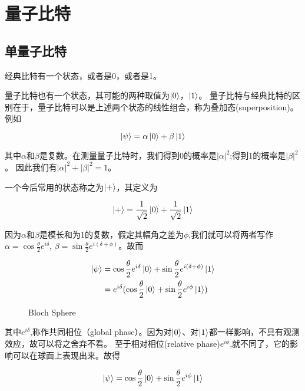 \section{量子比特}

\subsection{单量子比特}

经典比特有一个状态，或者是0，或者是1。

量子比特也有一个状态，其可能的两种取值为$\ket{0}$，$\ket{1}$。
量子比特与经典比特的区别在于，量子比特可以是上述两个状态的线性组合，称为叠加态(superposition)。例如

\begin{equation}
\ket{\psi} = \alpha\ket{0} + \beta\ket{1}
\end{equation}

其中$\alpha$和$\beta$是复数。在测量量子比特时，我们得到0的概率是$|\alpha|^2$;得到1的概率是$|\beta|^2$。
因此我们有$|\alpha|^2 + |\beta|^2 = 1$。

一个今后常用的状态称之为$\ket{+}$，其定义为

\begin{equation}
\ket{+} = \frac{1}{\sqrt{2}}\ket{0} + \frac{1}{\sqrt{2}}\ket{1}
\end{equation}

因为$\alpha$和$\beta$是模长和为1的复数，假定其幅角之差为$\phi$,我们就可以将两者写作
$\alpha = \cos\frac{\theta}{2}e^{i\delta}$, $\beta = \sin\frac{\theta}{2}e^{i(\delta + \phi)}$。故而

\begin{equation}
\begin{aligned}
\ket{\psi} &= \cos\frac{\theta}{2}e^{i\delta}\ket{0} + \sin\frac{\theta}{2}e^{i(\delta + \phi)}\ket{1} \\
&= e^{i\delta}(\cos\frac{\theta}{2}\ket{0} + \sin\frac{\theta}{2}e^{i\phi}\ket{1})
\end{aligned}
\end{equation}

\begin{figure}
  \centering
  
  \caption{Bloch Sphere}
\end{figure}

其中$e^{i\delta}$,称作共同相位（global phase）。因为对$\ket{0}$、对$\ket{1}$都一样影响，不具有观测效应，故可以将之舍弃不看。
至于相对相位(relative phase)$e^{i\phi}$,就不同了，它的影响可以在球面上表现出来。故得

\begin{equation}
\ket{\psi} = \cos\frac{\theta}{2}\ket{0} + \sin\frac{\theta}{2}e^{i\phi}\ket{1}
\end{equation}


